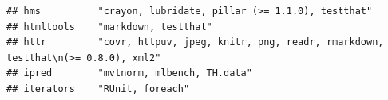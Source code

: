 \documentclass[]{article}
\begin{document}
\begin{verbatim}
## hms          "crayon, lubridate, pillar (>= 1.1.0), testthat"                                                                                                                                                                                                                                                                                                                                                                                                                                                                                                                                          
## htmltools    "markdown, testthat"                                                                                                                                                                                                                                                                                                                                                                                                                                                                                                                                                                      
## httr         "covr, httpuv, jpeg, knitr, png, readr, rmarkdown, testthat\n(>= 0.8.0), xml2"                                                                                                                                                                                                                                                                                                                                                                                                                                                                                                            
## ipred        "mvtnorm, mlbench, TH.data"                                                                                                                                                                                                                                                                                                                                                                                                                                                                                                                                                               
## iterators    "RUnit, foreach"                                                                                                                                                                                                                                                                                                                                                                                                                                                                                                                                                                          

\end{verbatim}
\end{document}
